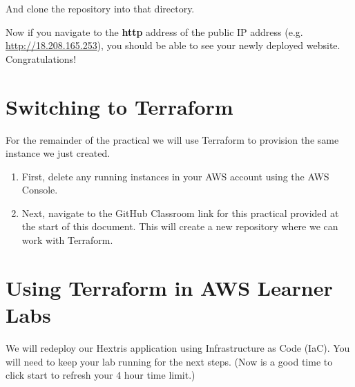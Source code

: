 \documentclass{csse4400}
\begin{document}
And clone the repository into that directory.



Now if you navigate to the \textbf{http} address of the public IP address (e.g. \url{http://18.208.165.253}),
you should be able to see your newly deployed website.
Congratulations!




\section{Switching to Terraform}

For the remainder of the practical we will use Terraform to provision the same instance we just created.

\begin{enumerate}
    \item First, delete any running instances in your AWS account using the AWS Console.
    \item Next, navigate to the GitHub Classroom link for this practical provided at the start of this document.
          This will create a new repository where we can work with Terraform.
\end{enumerate}


\section{Using Terraform in AWS Learner Labs}
We will redeploy our Hextris application using Infrastructure as Code (IaC).
You will need to keep your lab running for the next steps.
(Now is a good time to click start to refresh your 4 hour time limit.)
\end{document}
